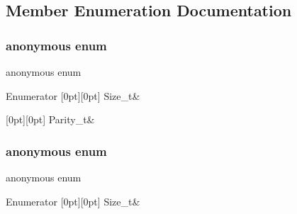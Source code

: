 \subsection{Member Enumeration Documentation}
\mbox{\label{structHadron_1_1HuRep_a9ec388d81123fad6325ebf58fb2e2cc3}} 
\subsubsection{\texorpdfstring{anonymous enum}{anonymous enum}}
{\footnotesize\ttfamily anonymous enum}

\begin{DoxyEnumFields}{Enumerator}
[0pt][0pt]{}\mbox{\label{structHadron_1_1HuRep_a43686c1c11b058cccdc4e7f8cdb93cc8a11f941d99fca7e86652c1460d6c185ed}} 
Size\+\_\+t&\\
\hline

[0pt][0pt]{}\mbox{\label{structHadron_1_1HuRep_a9ec388d81123fad6325ebf58fb2e2cc3aa750a82d32ba8a198ebecc777b696686}} 
Parity\+\_\+t&\\
\hline

\end{DoxyEnumFields}
\mbox{\label{structHadron_1_1HuRep_a9c0b3097c414315462c65a9c53c52043}} 
\subsubsection{\texorpdfstring{anonymous enum}{anonymous enum}}
{\footnotesize\ttfamily anonymous enum}

\begin{DoxyEnumFields}{Enumerator}
[0pt][0pt]{}\mbox{\label{structHadron_1_1HuRep_a43686c1c11b058cccdc4e7f8cdb93cc8a11f941d99fca7e86652c1460d6c185ed}} 
Size\+\_\+t&\\
\hline

\end{DoxyEnumFields}
\mbox{\label{structHadron_1_1HuRep_a43686c1c11b058cccdc4e7f8cdb93cc8}} 
